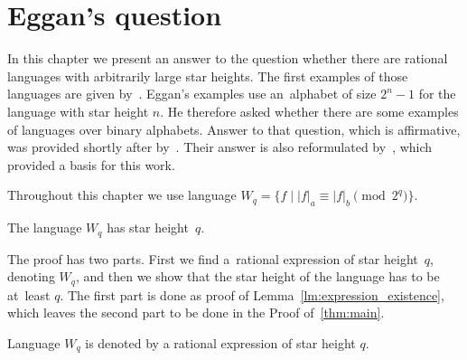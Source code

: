 \chapter{Eggan's question}

In this chapter we present an answer to the question whether there are rational languages with arbitrarily large star heights. The first examples of those languages are given by~\cite{Eggan63}.  Eggan's examples use an~alphabet of size $2^n - 1$ for the language with star height $n$. He therefore asked whether there are some examples of languages over binary alphabets. Answer to that question, which is affirmative, was provided shortly after by~\cite{DejeanSchutzenberger66}. Their answer is also reformulated by~\cite{Sakarovitch09}, which provided a basis for this work.

Throughout this chapter we use language $W_q = {\{f \mid |f|_a \equiv |f|_b \pmod{2^q} \}}$.

\begin{thm}\label{thm:main}
    The language $W_q$ has star height~$q$.
\end{thm}

The proof has two parts. First we find a~rational expression of star height~$q$, denoting $W_q$, and then we show that the star height of the language has to be at~least $q$. The first part is done as proof of Lemma~\ref*{lm:expression_existence}, which leaves the second part to be done in the Proof of~\autoref*{thm:main}.

\begin{lemma}\label{lm:expression_existence}
    Language $W_q$ is denoted by a rational expression of star height $q$.
\end{lemma}


